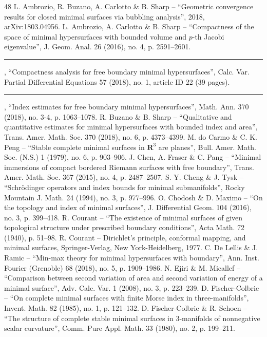         	 	
\begingroup\footnotesize
\begin{thebibliography}{48}
 L. Ambrozio, R. Buzano, A. Carlotto \& B. Sharp – “Geometric convergence results for closed minimal surfaces via bubbling analysis”, 2018, arXiv:1803.04956.
 L. Ambrozio, A. Carlotto \& B. Sharp – “Compactness of the space of minimal hypersurfaces with bounded volume and $p$-th Jacobi eigenvalue”, J. Geom. Anal. 26 (2016), no. 4, p. 2591–2601.
 \rule{2em}{.3pt} , “Compactness analysis for free boundary minimal hypersurfaces”, Calc. Var. Partial Diﬀerential Equations 57 (2018), no. 1, article ID 22 (39 pages).
 \rule{2em}{.3pt} , “Index estimates for free boundary minimal hypersurfaces”, Math. Ann. 370 (2018), no. 3-4, p. 1063–1078.
 R. Buzano \& B. Sharp – “Qualitative and quantitative estimates for minimal hypersurfaces with bounded index and area”, Trans. Amer. Math. Soc. 370 (2018), no. 6, p. 4373–4399.
 M. do Carmo \& C. K. Peng – “Stable complete minimal surfaces in $\mathbf{R}^3$ are planes”, Bull. Amer. Math. Soc. (N.S.) 1 (1979), no. 6, p. 903–906.
 J. Chen, A. Fraser \& C. Pang – “Minimal immersions of compact bordered Riemann surfaces with free boundary”, Trans. Amer. Math. Soc. 367 (2015), no. 4, p. 2487–2507.
 S. Y. Cheng \& J. Tysk – “Schrödinger operators and index bounds for minimal submanifolds”, Rocky Mountain J. Math. 24 (1994), no. 3, p. 977–996.
 O. Chodosh \& D. Maximo – “On the topology and index of minimal surfaces”, J. Diﬀerential Geom. 104 (2016), no. 3, p. 399–418.
 R. Courant – “The existence of minimal surfaces of given topological structure under prescribed boundary conditions”, Acta Math. 72 (1940), p. 51–98.
 R. Courant – Dirichlet’s principle, conformal mapping, and minimal surfaces, Springer-Verlag, New York-Heidelberg, 1977.
 C. De Lellis \& J. Ramic – “Min-max theory for minimal hypersurfaces with boundary”, Ann. Inst. Fourier (Grenoble) 68 (2018), no. 5, p. 1909–1986.
 N. Ejiri \& M. Micallef – “Comparison between second variation of area and second variation of energy of a minimal surface”, Adv. Calc. Var. 1 (2008), no. 3, p. 223–239.
 D. Fischer-Colbrie – “On complete minimal surfaces with ﬁnite Morse index in three-manifolds”, Invent. Math. 82 (1985), no. 1, p. 121–132.
 D. Fischer-Colbrie \& R. Schoen – “The structure of complete stable minimal surfaces in $3$-manifolds of nonnegative scalar curvature”, Comm. Pure Appl. Math. 33 (1980), no. 2, p. 199–211.

\end{thebibliography}
